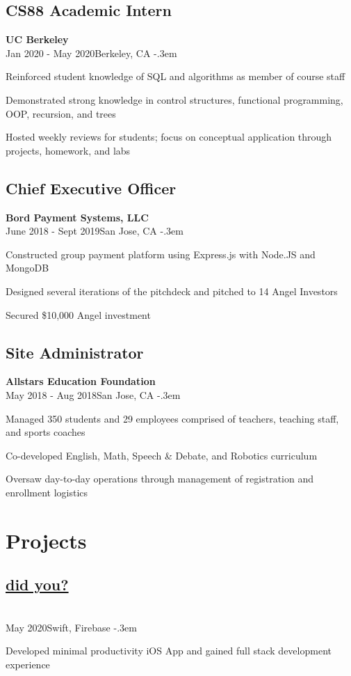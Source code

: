 \documentclass{article}
\let\olditemize=\itemize \let\endolditemize=\enditemize
\renewenvironment{itemize}{\olditemize[topsep=0em] \itemsep-.3em}{\endolditemize}
\newcommand{\entry}[3]{\quad\textbf{#1}\\#2\qquad#3}
\begin{document}
	\subsection{CS88 Academic Intern}
	\entry{UC Berkeley}{Jan 2020 - May 2020}{Berkeley, CA}
	\begin{itemize}
		\item Reinforced student knowledge of SQL and
		algorithms as member of course staff
		\item Demonstrated strong knowledge in control structures, functional programming,
		OOP, recursion, and trees
		\item Hosted weekly reviews for students; focus on conceptual
		application through projects, homework, and labs
	\end{itemize}
	
	\subsection{Chief Executive Officer}
	\entry{Bord Payment Systems, LLC}{June 2018 - Sept 2019}{San Jose, CA}
	\begin{itemize}
		\item Constructed group payment platform using Express.js with Node.JS and MongoDB
		\item Designed several iterations of the pitchdeck and pitched to 14 Angel Investors
		\item Secured \$10,000 Angel investment
	\end{itemize}
	\subsection{Site Administrator}
	\entry{Allstars Education Foundation}{May 2018 - Aug 2018}{San Jose, CA}
	\begin{itemize}
		\item Managed 350 students and 29 employees comprised of teachers, teaching staff, and sports coaches
		\item Co-developed English, Math, Speech \& Debate, and Robotics curriculum
		\item Oversaw day-to-day operations through management of registration and enrollment logistics
	\end{itemize}
	
	\section{Projects}
	\subsection{\texorpdfstring{\protect\href{https://github.com/jaykudva/did-you-}{did you?}} ?}
	\entry{}{May 2020}{Swift, Firebase}
	\begin{itemize}
		\item Developed minimal productivity iOS App and gained full stack development experience 
	\end{itemize}
\end{document}
